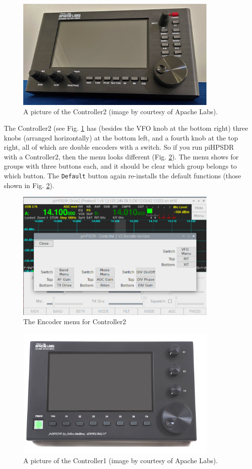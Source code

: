 \documentclass[12pt]{book}
\def\rett#1{\texttt{\color{red}#1}}
\def\pH{pi\-HPSDR\xspace}
\begin{document}
\begin{figure}[ht!]
\center
\includegraphics[width=10cm]{Apache_Controller2.png}
\caption{A picture of the Controller2 (image by courtesy of Apache Labs).}
\label{fig:Apache_Controller2}
\end{figure}

The Controller2 (see Fig. \ref{fig:Apache_Controller2}
has (besides the VFO knob at the bottom right) three knobs (arranged horizontally) at the bottom left,
and a fourth knob at the top right, all of which are double encoders with a switch.
So if you run \pH with a Controller2, then the menu looks different (Fig. \ref{fig:EncoderMenuV2}).
 The menu shows
for groups with three buttons each, and it should be clear which group belongs to which button. The
\rett{Default} button again re-installs the default functions (those shown in Fig. \ref{fig:EncoderMenuV2}).

\begin{figure}[ht!]
\center
\includegraphics[width=10cm]{EncoderMenuV2.png}
\caption{The Encoder menu for Controller2}
\label{fig:EncoderMenuV2}
\end{figure}

\begin{figure}[ht!]
\center
\includegraphics[width=10cm]{Apache_Controller1.png}
\caption{A picture of the Controller1 (image by courtesy of Apache Labs).}
\label{fig:Apache_Controller1}
\end{figure}
\end{document}
